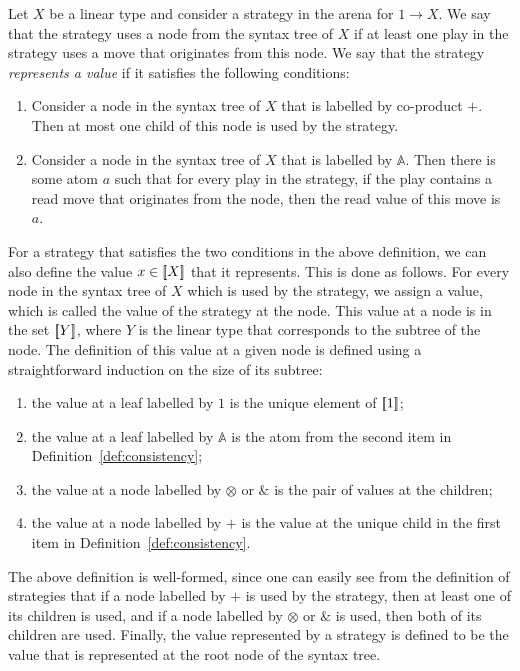 \documentclass[10pt,a4paper]{amsart}
\numberwithin{equation}{section}
\theoremstyle{plain}
\newcommand{\sem}[1]{[{\kern-0.45ex}[#1]{\kern-0.45ex}]}
\newcommand{\atoms}{\mathbb A}
\begin{document}
\begin{definition}\label{def:consistency}
    Let $X$ be a linear type and consider a  strategy in  the arena for $1 \to X$. We say that the strategy uses a node from the syntax tree of $X$ if at least one play in the strategy uses a move that originates from this node. We say that the  strategy    \emph{represents a value} if it satisfies the following conditions: 
    \begin{enumerate}
        \item Consider a node in  the syntax tree of $X$ that is labelled by co-product $+$. Then at most one child of this node is  used by the strategy. 
        \item Consider a node  in the syntax tree of $X$ that  is labelled by $\atoms$. Then there is some atom $a$ such that for every play in the strategy, if the play contains a read move that originates from the node, then the read value of this move is $a$. 
    \end{enumerate}
\end{definition}

For a strategy that satisfies the two conditions in the above definition, we can also define the value $x \in \sem X$ that it represents.  This is done as follows.  For every node  in the syntax tree  of $X$ which is used by the strategy, we assign a value, which is called the value of the strategy at the node. This value at a node is in the set $\sem Y$, where $Y$ is the linear type that corresponds to the subtree of the node.  The definition of this value at a given node  is defined using a straightforward induction on the size of its subtree: 
\begin{enumerate}
    \item the value at a leaf labelled by $1$ is the unique element of $\sem 1$;
    \item the value at a leaf labelled by $\atoms$ is the atom from the second item in Definition~\ref{def:consistency};
    \item the value at a node labelled by $\otimes$ or $\&$ is the pair of values at the children;
    \item the value at a node labelled by $+$ is the value at  the unique child in the first item in Definition~\ref{def:consistency}.
\end{enumerate}
The above definition is well-formed, since one can easily see from the definition of strategies that if a node labelled by $+$ is used by the strategy, then at least one of its children is used, and if a node labelled by $\otimes$ or $\&$ is used, then both of its children are used. Finally, the value represented by a strategy is defined to be the value that is represented at the root node of the syntax tree. 
\end{document}
